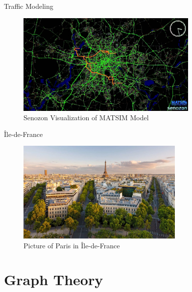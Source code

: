 \documentclass[10pt, aspectratio=169]{beamer}
\begin{document}
\begin{frame}[fragile]{Traffic Modeling}
    \begin{center}
        \begin{figure}
            \centering
            \includegraphics[height=5cm, keepaspectratio]{images/senozon.jpeg}
            \caption{Senozon Visualization of MATSIM Model \cite{senozon}}
        \end{figure}
    \end{center}
\end{frame}

\begin{frame}{Île-de-France}
    \begin{center}
        \begin{figure}
            \centering
            \includegraphics[height=5cm, keepaspectratio]{images/iledefrance.png}
            \caption{Picture of Paris in Île-de-France \cite{iledefrance}}
        \end{figure}
    \end{center}
\end{frame}

\section{Graph Theory}
\end{document}
